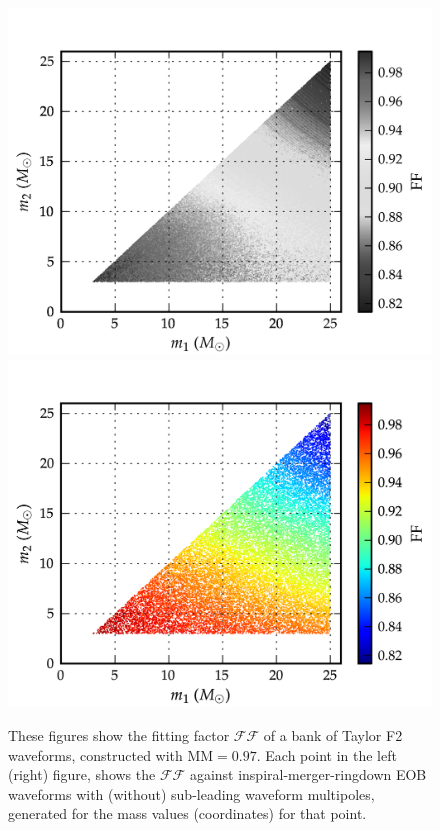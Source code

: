 \documentclass[aps,
prd,
amsmath,
amssymb,
twocolumn,
floatfix,
groupedaddress]{revtex4-1}
\newcommand{\FF}{\mathcal{FF}}
\newcommand{\MM}{\mathrm{MM}}
\begin{document}
\begin{figure}
\centerline{
\includegraphics[scale=0.04, clip=false, keepaspectratio=true, width=\columnwidth]{EOBHMvsF2FULLNolines.png} %
\includegraphics[scale=0.04, clip=false, keepaspectratio=true, width=\columnwidth]{EOB22vsF2FULLNolines.png} %
}
\caption{\label{fig:match_f2eob_f2eob22_all}These figures show the fitting factor $\mathcal{FF}$ of a bank of Taylor F2 waveforms, constructed with $\MM = 0.97$. Each point in the left (right) figure, shows the $\FF$ against inspiral-merger-ringdown EOB waveforms with (without) sub-leading waveform multipoles, generated for the mass values (coordinates) for that point.}
\end{figure}
\end{document}
